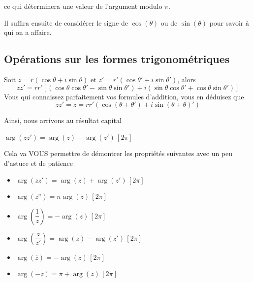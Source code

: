 \documentclass[french]{book}
\newcommand{\fr}[2]{\dfrac{#1}{#2}}
\newcommand{\pa}[1]{(#1)}
\newcommand{\cro}[1]{[#1]}
\newcommand{\cacheg}[1]{#1}
\begin{document}
ce qui déterminera une valeur de l'argument modulo $\pi$. 

Il  suffira ensuite  de  considérer  le signe  de  $\cos(\theta)$ ou  de
$\sin(\theta)$ pour savoir à qui on a affaire. 
















\subsection{Opérations sur les formes trigonométriques}

Soit $z=r\pa{\cos\theta+i\sin\theta}$ et $z'=r'\pa{\cos\theta'+i\sin\theta'}$,  alors 
$$zz'=rr'\cro{\pa{\cos\theta\cos\theta'-\sin\theta\sin\theta'}+i\pa{\sin\theta\cos\theta'+\cos\theta\sin\theta'}}$$ 
Vous qui connaissez parfaitement vos formules d'addition, vous en déduisez que 
$$zz'=z=rr'\pa{\cos\pa{\theta+\theta'}+i\sin\pa{\theta+\theta}'}$$

Ainsi, nous arrivons au résultat capital 


  \begin{prop}
    $\arg(zz')=$\cacheg{$\arg(z)+\arg(z') \,[2\pi]$}
    \end{prop}
  




Cela va VOUS permettre de démontrer les propriétés suivantes avec un peu d'astuce et de patience



  \begin{prop}
    \begin{itemize}
\item[$\bullet$] $\arg(zz')=$\cacheg{$\arg(z)+\arg(z') \,[2\pi]$}
\item[$\bullet$] $\arg(z^n)=$\cacheg{$n\arg(z)\,[2\pi]$}
\item[$\bullet$] $\arg\pa{\fr{1}{z}}=$\cacheg{$-\arg(z)\,[2\pi]$}
\item[$\bullet$] $\arg\pa{\fr{z}{z'}}=$\cacheg{$\arg(z)-\arg(z')\,[2\pi]$}
\item[$\bullet$] $\arg(\overline{z})=$\cacheg{$-\arg(z)\,[2\pi]$}
\item[$\bullet$] $\arg(-z)=$\cacheg{$\pi+\arg(z)\,[2\pi]$}
\end{itemize}
    \end{prop}
  
\end{document}
